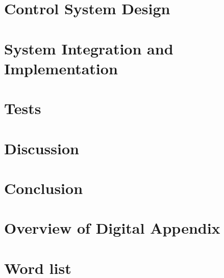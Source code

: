 \documentclass[a4paper, 10pt]{article}
\begin{document}
\section{Control System Design}\label{sec:System_Design}

\section{System Integration and Implementation}\label{sec:System_Integration_N_Implementation}



\section{Tests}\label{sec:Test}


\section{Discussion}\label{sec:Discussion}



\section{Conclusion}\label{sec:Conclusion}

\newpage



 
\newpage

\section{Overview of Digital Appendix}\label{sec:digital_appendix}


\newpage
\section{Word list}\label{sec:wordlist}

\end{document}
